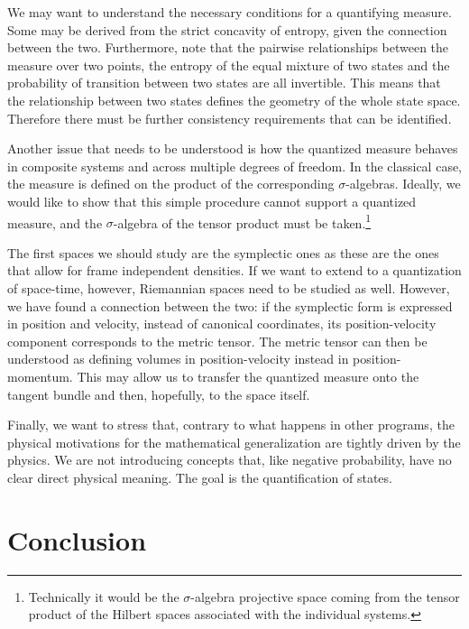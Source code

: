 \documentclass[10pt,twocolumn, nofootinbib]{revtex4-2}
\begin{document}
We may want to understand the necessary conditions for a quantifying measure. Some may be derived from the strict concavity of entropy, given the connection between the two. Furthermore, note that the pairwise relationships between the measure over two points, the entropy of the equal mixture of two states and the probability of transition between two states are all invertible. This means that the relationship between two states defines the geometry of the whole state space. Therefore there must be further consistency requirements that can be identified.

Another issue that needs to be understood is how the quantized measure behaves in composite systems and across multiple degrees of freedom. In the classical case, the measure is defined on the product of the corresponding $\sigma$-algebras. Ideally, we would like to show that this simple procedure cannot support a quantized measure, and the $\sigma$-algebra of the tensor product must be taken.\footnote{Technically it would be the $\sigma$-algebra projective space coming from the tensor product of the Hilbert spaces associated with the individual systems.}

The first spaces we should study are the symplectic ones as these are the ones that allow for frame independent densities. If we want to extend to a quantization of space-time, however, Riemannian spaces need to be studied as well. However, we have found a connection between the two: if the symplectic form is expressed in position and velocity, instead of canonical coordinates, its position-velocity component corresponds to the metric tensor. The metric tensor can then be understood as defining volumes in position-velocity instead in position-momentum. This may allow us to transfer the quantized measure onto the tangent bundle and then, hopefully, to the space itself.

Finally, we want to stress that, contrary to what happens in other programs, the physical motivations for the mathematical generalization are tightly driven by the physics. We are not introducing concepts that, like negative probability, have no clear direct physical meaning. The goal is the quantification of states.

\section{Conclusion}
\end{document}
